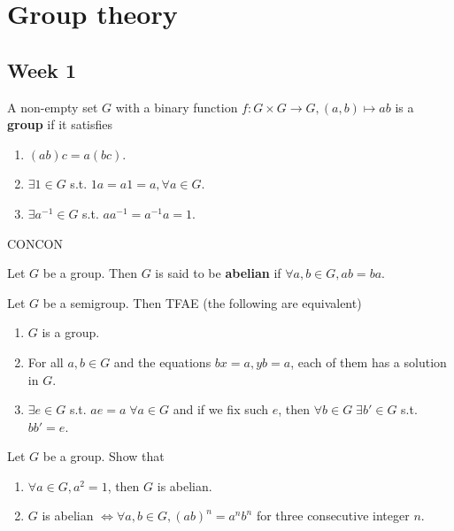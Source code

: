 \section{Group theory}

\subsection{Week 1}

\begin{definition}
  A non-empty set $G$ with a binary function $f: G \times G \to G,
  (a, b) \mapsto ab$
  is a {\bf group} if it satisfies
  \begin{enumerate}
    \item $(ab)c = a(bc)$.
    \item $\exists 1 \in G$ s.t. $1a = a1 = a, \forall a \in G$.
    \item $\exists a^{-1} \in G$ s.t. $aa^{-1} = a^{-1}a = 1$.
  \end{enumerate}
\end{definition}

CONCON

\begin{definition}
  Let $G$ be a group. Then $G$ is said to be {\bf abelian} if
  $\forall a, b \in G, ab = ba$.
\end{definition}

\begin{exercise}
  Let $G$ be a semigroup. Then TFAE (the following are equivalent)
  \begin{enumerate}
    \item $G$ is a group.
    \item For all $a, b \in G$ and the equations $bx=a, yb=a$, each of them
      has a solution in $G$.
    \item $\exists e \in G$ s.t. $ae=a \; \forall a \in G$ and if we fix
      such $e$, then $\forall b \in G \; \exists b' \in G$ s.t. $bb' = e$.
  \end{enumerate}
\end{exercise}

\begin{exercise}
  Let $G$ be a group. Show that
  \begin{enumerate}
    \item $\forall a \in G, a^2 = 1$, then $G$ is abelian.
    \item $G$ is abelian $\iff \forall a, b \in G, (ab)^n = a^n b^n$ for three
      consecutive integer $n$.
  \end{enumerate}
\end{exercise}

